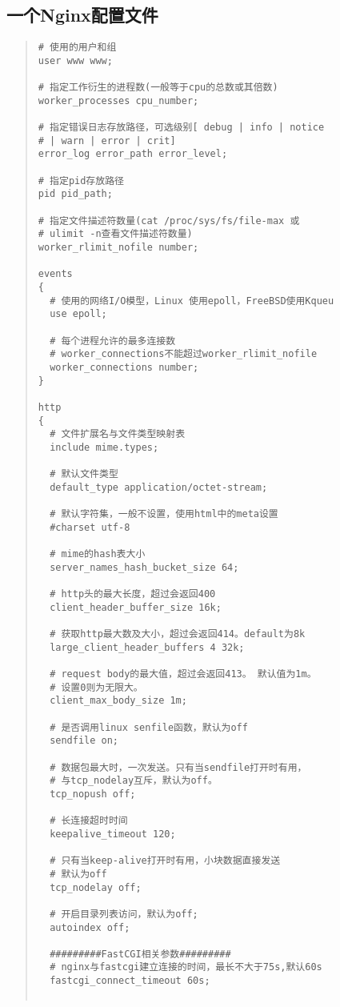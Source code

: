 \documentclass[UTF8]{ctexart}
\newenvironment{myquote}
  {\begin{quote} \kaishu \zihao{-5}}
  {\end{quote}}
\begin{document}
\subsection{一个Nginx配置文件}
\begin{myquote}
  \begin{verbatim}
# 使用的用户和组
user www www;

# 指定工作衍生的进程数(一般等于cpu的总数或其倍数)
worker_processes cpu_number;

# 指定错误日志存放路径，可选级别[ debug | info | notice
# | warn | error | crit]
error_log error_path error_level;

# 指定pid存放路径
pid pid_path;

# 指定文件描述符数量(cat /proc/sys/fs/file-max 或
# ulimit -n查看文件描述符数量)
worker_rlimit_nofile number;

events
{
  # 使用的网络I/O模型，Linux 使用epoll，FreeBSD使用Kqueu
  use epoll;

  # 每个进程允许的最多连接数
  # worker_connections不能超过worker_rlimit_nofile
  worker_connections number;
}

http
{
  # 文件扩展名与文件类型映射表
  include mime.types;

  # 默认文件类型
  default_type application/octet-stream;

  # 默认字符集，一般不设置，使用html中的meta设置
  #charset utf-8

  # mime的hash表大小
  server_names_hash_bucket_size 64;

  # http头的最大长度，超过会返回400
  client_header_buffer_size 16k;

  # 获取http最大数及大小，超过会返回414。default为8k
  large_client_header_buffers 4 32k;

  # request body的最大值，超过会返回413。 默认值为1m。
  # 设置0则为无限大。
  client_max_body_size 1m;

  # 是否调用linux senfile函数，默认为off
  sendfile on;

  # 数据包最大时，一次发送。只有当sendfile打开时有用，
  # 与tcp_nodelay互斥，默认为off。
  tcp_nopush off;

  # 长连接超时时间
  keepalive_timeout 120;

  # 只有当keep-alive打开时有用，小块数据直接发送
  # 默认为off
  tcp_nodelay off;

  # 开启目录列表访问，默认为off;
  autoindex off;

  #########FastCGI相关参数#########
  # nginx与fastcgi建立连接的时间，最长不大于75s,默认60s
  fastcgi_connect_timeout 60s;


\end{verbatim}
\end{myquote}
\end{document}
